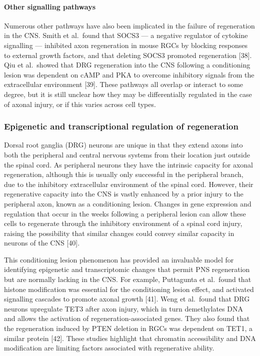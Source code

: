 \documentclass[
  12pt,
  a4paper,
]{book}
\begin{document}
\hypertarget{other-signalling-pathways}{%
\paragraph{Other signalling pathways}\label{other-signalling-pathways}}

Numerous other pathways have also been implicated in the failure of regeneration in the CNS. Smith et al.~found that SOCS3 --- a negative regulator of cytokine signalling --- inhibited axon regeneration in mouse RGCs by blocking responses to external growth factors, and that deleting SOCS3 promoted regeneration {[}38{]}. Qiu et al.~showed that DRG regeneration into the CNS following a conditioning lesion was dependent on cAMP and PKA to overcome inhibitory signals from the extracellular environment {[}39{]}. These pathways all overlap or interact to some degree, but it is still unclear how they may be differentially regulated in the case of axonal injury, or if this varies across cell types.

\hypertarget{epigenetic-and-transcriptional-regulation-of-regeneration}{%
\subsubsection{Epigenetic and transcriptional regulation of regeneration}\label{epigenetic-and-transcriptional-regulation-of-regeneration}}

Dorsal root ganglia (DRG) neurons are unique in that they extend axons into both the peripheral and central nervous systems from their location just outside the spinal cord. As peripheral neurons they have the intrinsic capacity for axonal regeneration, although this is usually only successful in the peripheral branch, due to the inhibitory extracellular environment of the spinal cord. However, their regenerative capacity into the CNS is vastly enhanced by a prior injury to the peripheral axon, known as a conditioning lesion. Changes in gene expression and regulation that occur in the weeks following a peripheral lesion can allow these cells to regenerate through the inhibitory environment of a spinal cord injury, raising the possibility that similar changes could convey similar capacity in neurons of the CNS {[}40{]}.

This conditioning lesion phenomenon has provided an invaluable model for identifying epigenetic and transcriptomic changes that permit PNS regeneration but are normally lacking in the CNS. For example, Puttagunta et al.~found that histone modification was essential for the conditioning lesion effect, and activated signalling cascades to promote axonal growth {[}41{]}. Weng et al.~found that DRG neurons upregulate TET3 after axon injury, which in turn demethylates DNA and allows the activation of regeneration-associated genes. They also found that the regeneration induced by PTEN deletion in RGCs was dependent on TET1, a similar protein {[}42{]}. These studies highlight that chromatin accessibility and DNA modification are limiting factors associated with regenerative ability.
\end{document}
